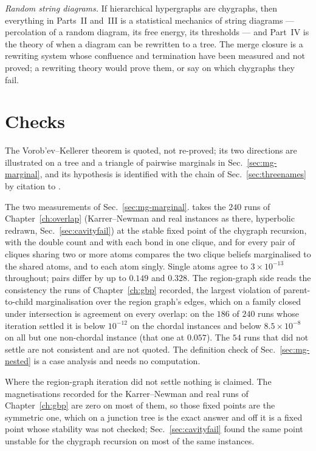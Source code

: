 \emph{Random string diagrams.} If hierarchical hypergraphs are chygraphs,
then everything in Parts~II and~III is a statistical mechanics of string
diagrams --- percolation of a random diagram, its free energy, its
thresholds --- and Part~IV is the theory of when a diagram can be rewritten
to a tree. The merge closure is a rewriting system whose confluence and
termination have been measured and not proved; a rewriting theory would
prove them, or say on which chygraphs they fail.

\section{Checks}
\label{sec:mg-checks}

The Vorob'ev--Kellerer theorem is quoted, not re-proved; its two directions
are illustrated on a tree and a triangle of pairwise marginals in
Sec.~\ref{sec:mg-marginal}, and its hypothesis is identified with the
chain of Sec.~\ref{sec:threenames} by citation to \citet{beeri1983}.

The two measurements of Sec.~\ref{sec:mg-marginal}.
takes the $240$ runs of Chapter~\ref{ch:overlap} (Karrer--Newman and real
instances as there, hyperbolic redrawn, Sec.~\ref{sec:cavityfail}) at the
stable fixed point of the chygraph recursion, with the double count and
with each bond in one clique, and for every pair of cliques sharing two or
more atoms compares the two clique beliefs marginalised to the shared
atoms, and to each atom singly. Single atoms agree to $3\times10^{-13}$
throughout; pairs differ by up to $0.149$ and $0.328$. The region-graph
side reads the consistency the runs of Chapter~\ref{ch:gbp} recorded, the
largest violation of parent-to-child marginalisation over the region
graph's edges, which on a family closed under intersection is agreement on
every overlap: on the $186$ of $240$ runs whose iteration settled it is
below $10^{-12}$ on the chordal instances and below $8.5\times10^{-8}$ on
all but one non-chordal instance (that one at $0.057$). The $54$ runs that
did not settle are not consistent and are not quoted. The definition
check of Sec.~\ref{sec:mg-nested} is a case analysis and needs no
computation.

Where the region-graph iteration did not settle nothing is claimed. The
magnetisations recorded for the Karrer--Newman and real runs of
Chapter~\ref{ch:gbp} are zero on most of them, so those fixed points are
the symmetric one, which on a junction tree is the exact answer and off
it is a fixed point whose stability was not checked; Sec.~\ref{sec:cavityfail}
found the same point unstable for the chygraph recursion on most of the
same instances.
